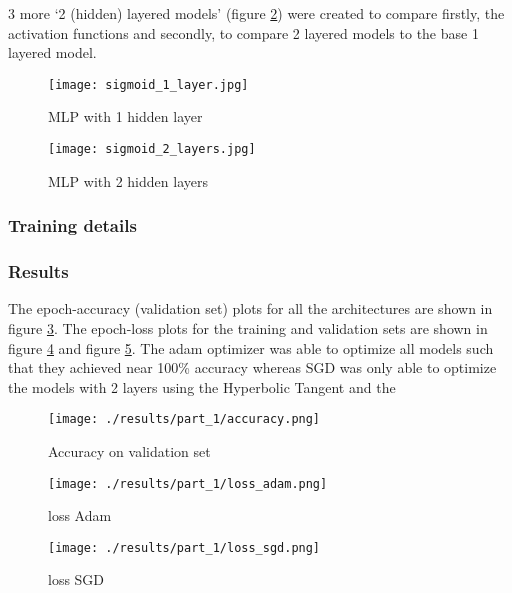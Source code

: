 3 more `2 (hidden) layered models' (figure \ref{fig: NN 2l}) were created to compare firstly, the activation
functions and secondly, to compare 2 layered models to the base 1 layered model.


\begin{figure}
    \centering
    \texttt{[image: sigmoid\_1\_layer.jpg]}
    \caption{MLP with 1 hidden layer}
    \label{fig: NN 1l}
\end{figure}

\begin{figure}
    \centering
    \texttt{[image: sigmoid\_2\_layers.jpg]}
    \caption{MLP with 2 hidden layers}
    \label{fig: NN 2l}
\end{figure}

\subsubsection{Training details}


\subsubsection{Results}

The epoch-accuracy (validation set) plots for all the architectures are shown in figure 
\ref{fig: Accuracy}. The epoch-loss plots for the training and validation sets are shown in figure \ref*{fig: loss curves-Adam}
and figure \ref{fig: loss curves-SGD}. The adam optimizer was able to optimize
all models such that they achieved near 100\% accuracy whereas SGD was only able
to optimize the models with 2 layers using the Hyperbolic Tangent and the 


\begin{figure}
    \centering
    \texttt{[image: ./results/part\_1/accuracy.png]}
    \caption{Accuracy on validation set}
    \label{fig: Accuracy}
\end{figure}

\begin{figure}
    \centering
    \texttt{[image: ./results/part\_1/loss\_adam.png]}
    \caption{loss Adam}
    \label{fig: loss curves-Adam}
\end{figure}

\begin{figure}
    \centering
    \texttt{[image: ./results/part\_1/loss\_sgd.png]}
    \caption{loss SGD}
    \label{fig: loss curves-SGD}
\end{figure}

